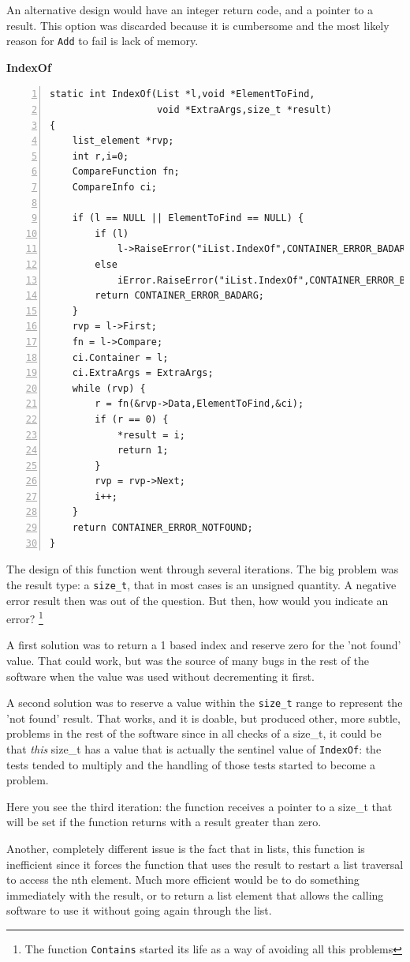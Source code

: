 \documentclass[12pt,a4paper]{memoir} %
\newif\iftth
\newcommand{\container}{}
\newcommand{\function}[1] {%
\vspace{0.2in}
\par\noindent
\textbf{#1}\index{#1!code for \container} \hrulefill
\iftth\else
\nopagebreak
\fi
\noindent\begin{Verbatim}[numbers=left, xleftmargin=7mm]}
\begin{document}
{{An alternative design would have an integer return code, and a pointer to a result. This option was discarded because it is cumbersome and the most likely reason for \texttt{Add} to fail is lack of memory.
\function{IndexOf}
static int IndexOf(List *l,void *ElementToFind,
                   void *ExtraArgs,size_t *result)
{
    list_element *rvp;
    int r,i=0;
    CompareFunction fn;
    CompareInfo ci;

    if (l == NULL || ElementToFind == NULL) {
        if (l)
            l->RaiseError("iList.IndexOf",CONTAINER_ERROR_BADARG);
        else
            iError.RaiseError("iList.IndexOf",CONTAINER_ERROR_BADARG);
        return CONTAINER_ERROR_BADARG;
    }
    rvp = l->First;
    fn = l->Compare;
    ci.Container = l;
    ci.ExtraArgs = ExtraArgs;
    while (rvp) {
        r = fn(&rvp->Data,ElementToFind,&ci);
        if (r == 0) {
            *result = i;
            return 1;
        }
        rvp = rvp->Next;
        i++;
    }
    return CONTAINER_ERROR_NOTFOUND;
}
\end{Verbatim}
The design of this function went through several iterations. The big problem was the result type: a \texttt{size\_t}, that in most cases is an unsigned quantity. A negative error result then was out of the question. But then, how would you indicate an error? \footnote{The function \texttt{Contains} started its life as a way of avoiding all this problems}

A first solution was to return a 1 based index and reserve zero for the 'not found' value. That could work, but was the source of many bugs in the rest of the software when the value was used without decrementing it first. 

A second solution was to reserve a value within the \texttt{size\_t} range to represent the 'not found' result. That works, and it is doable, but produced other, more subtle, problems in the rest of the software since in all checks of a size\_t, it could be that \textsl{this} size\_t has a value that is actually the sentinel value of \texttt{IndexOf}: the tests tended to multiply and the handling of those tests started to become a problem.

Here you see the third iteration: the function receives a pointer to a size\_t that will be set if the function returns with a result greater than zero.

Another, completely different issue is the fact that in lists, this function is inefficient since it forces the function that uses the result to restart a list traversal to access the nth element. Much more efficient would be to do something immediately with the result, or to return a list element that allows the calling software to use it without going again through the list. 

}}
\end{document}
